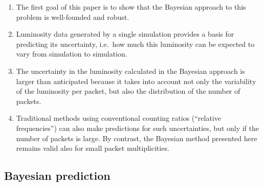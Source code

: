 \documentclass[11pt]{article}
\begin{document}
\begin{enumerate}
\item The first goal of this paper is to show that the Bayesian
  approach to this problem is well-founded and robust.

\item Luminosity data generated by a single simulation provides a
  basis for predicting its uncertainty, i.e.\ how much this luminosity
  can be expected to vary from simulation to simulation.

\item The uncertainty in the luminosity calculated in the Bayesian
  approach is larger than anticipated because it takes into account
  not only the variability of the luminosity per packet, but also the
  distribution of the number of packets.

\item Traditional methods using conventional counting ratios
  (``relative frequencies'') can also make predictions for such
  uncertainties, but only if the number of packets is large. By
  contrast, the Bayesian method presented here remains valid also for
  small packet multiplicities.

\end{enumerate}

\subsection{Bayesian prediction}
\label{sec:bayp}
\end{document}
